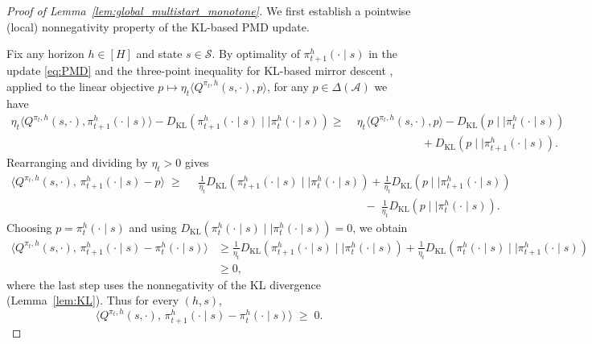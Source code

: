 \documentclass[11pt]{article}
\begin{document}
\begin{proof}[Proof of Lemma~\ref{lem:global_multistart_monotone}]
We first establish a pointwise (local) nonnegativity property of the KL-based PMD update.

Fix any horizon $h\in[H]$ and state $s\in\mathcal S$. By optimality of $\pi_{t+1}^h(\cdot\mid s)$ in the update \eqref{eq:PMD} and the three-point inequality for KL-based mirror descent \citep[see, e.g.,][]{lan2023policy,xiao2022convergence}, applied to the linear objective $p\mapsto \eta_t\langle Q^{\pi_t,h}(s,\cdot),p\rangle$, for any $p\in\Delta(\mathcal A)$ we have
\begin{align*}
\eta_t \big\langle Q^{\pi_t,h}(s,\cdot), \pi_{t+1}^h(\cdot\mid s) \big\rangle
- D_{\mathrm{KL}}\!\left(\pi_{t+1}^h(\cdot\mid s)\mid\mid\pi_t^h(\cdot\mid s)\right)
\ge& \;
\eta_t \big\langle Q^{\pi_t,h}(s,\cdot), p \big\rangle
- D_{\mathrm{KL}}\!\left(p\mid\mid\pi_t^h(\cdot\mid s)\right) \\
& \qquad \qquad \qquad+
D_{\mathrm{KL}}\!\left(p\mid\mid\pi_{t+1}^h(\cdot\mid s)\right).
\end{align*}
Rearranging and dividing by $\eta_t>0$ gives
\begin{align*}
\big\langle Q^{\pi_t,h}(s,\cdot),\, \pi_{t+1}^h(\cdot\mid s)-p \big\rangle
\;\ge\;&\;
\frac{1}{\eta_t}D_{\mathrm{KL}}\!\left(\pi_{t+1}^h(\cdot\mid s)\mid\mid\pi_t^h(\cdot\mid s)\right)
+\frac{1}{\eta_t}D_{\mathrm{KL}}\!\left(p\mid\mid\pi_{t+1}^h(\cdot\mid s)\right) \\
& \qquad \qquad \qquad \qquad \qquad \qquad \qquad \quad -\;
\frac{1}{\eta_t}D_{\mathrm{KL}}\!\left(p\mid\mid\pi_t^h(\cdot\mid s)\right).
\end{align*}
Choosing $p=\pi_t^h(\cdot\mid s)$ and using
$D_{\mathrm{KL}}(\pi_t^h(\cdot\mid s)\mid\mid\pi_t^h(\cdot\mid s))=0$, we obtain
\begin{align*}
    \big\langle Q^{\pi_t,h}(s,\cdot),\, \pi_{t+1}^h(\cdot\mid s)-\pi_t^h(\cdot\mid s) \big\rangle &
\ge
\frac{1}{\eta_t}D_{\mathrm{KL}}\!\left(\pi_{t+1}^h(\cdot\mid s)\mid\mid\pi_t^h(\cdot\mid s)\right)
+\frac{1}{\eta_t}D_{\mathrm{KL}}\!\left(\pi_t^h(\cdot\mid s)\mid\mid\pi_{t+1}^h(\cdot\mid s)\right) \\ & \ge 0,
\end{align*}
where the last step uses the nonnegativity of the KL divergence (Lemma~\ref{lem:KL}). Thus for every $(h,s)$,
\begin{equation}\label{eq:local_Q_nonneg_J}
\big\langle Q^{\pi_t,h}(s,\cdot),\, \pi_{t+1}^h(\cdot\mid s)-\pi_t^h(\cdot\mid s) \big\rangle
\;\ge\;0.
\end{equation}


\end{proof}
\end{document}
